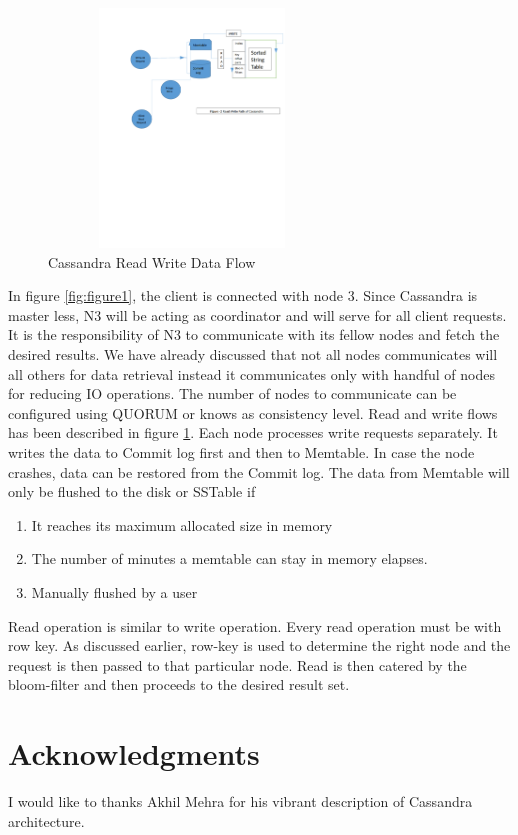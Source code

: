 \documentclass[9pt,twocolumn,twoside]{styles/osajnl}
\begin{document}
\begin{figure}[h]
\begin{center}
\includegraphics[width =3in,height=2.5in]{images/Cassandra_Write_Read_figure2}
\caption{Cassandra Read Write Data Flow}
\label{fig:figure2}
\end{center}
\end{figure}

In figure \ref{fig:figure1}, the client is connected with node 3. Since Cassandra is master less, N3 will be acting as coordinator and will serve for all client requests. It is the responsibility of N3 to communicate with its fellow nodes and fetch the desired results. We have already discussed that not all nodes communicates will all others for data retrieval instead it communicates only with handful of nodes for reducing IO operations. The number of nodes to communicate can be configured using QUORUM or knows as consistency level.
Read and write flows has been described in figure \ref{fig:figure2}. Each node processes write requests separately. It writes the data to Commit log first and then to Memtable. In case the node crashes, data can be restored from the Commit log. The data from Memtable will only be flushed to the disk or SSTable if 
\begin{enumerate}
     \item It reaches its maximum allocated size in memory
     \item The number of minutes a memtable can stay in memory elapses.   
     \item Manually flushed by a user  
\end{enumerate}
Read operation is similar to write operation. Every read operation must be with row key. As discussed earlier, row-key is used to determine the right node and the request is then passed to that particular node. Read is then catered by the bloom-filter and then proceeds to the desired result set.

\section*{Acknowledgments}

I would like to thanks Akhil Mehra for his vibrant description of Cassandra architecture.



\end{document}
